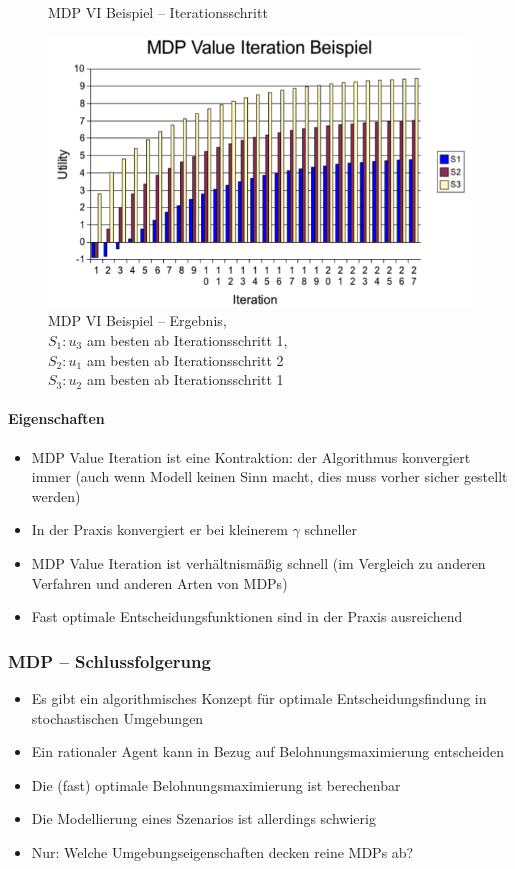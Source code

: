 \begin{itemize}
\begin{figure}[!h]
		\caption{MDP VI Beispiel -- Iterationsschritt}
		\label{fig:ch07:vi-bsp2}
	\end{figure}
	\begin{figure}[!h]
		\centering
  		\includegraphics[width=0.45\linewidth]{figures/ch07_vi-bsp3.png}
  		\centering
		\caption{MDP VI Beispiel -- Ergebnis, \\$S_1: u_3$ am besten ab Iterationsschritt 1,\\ $S_2: u_1$ am besten ab Iterationsschritt 2\\ $S_3: u_2$ am besten ab Iterationsschritt 1}
		\label{fig:ch07:vi-bsp2}
	\end{figure}
\end{itemize}
\paragraph{Eigenschaften}
\begin{itemize}
	\item MDP Value Iteration ist eine Kontraktion: der Algorithmus konvergiert immer (auch wenn Modell keinen Sinn macht, dies muss vorher sicher gestellt werden)
	\item In der Praxis konvergiert er bei kleinerem $\gamma$ schneller
	\item MDP Value Iteration ist verh\"altnism\"a{\ss}ig schnell (im Vergleich zu anderen Verfahren und anderen Arten von MDPs)
	\item Fast optimale Entscheidungsfunktionen sind in der Praxis ausreichend
\end{itemize}

\subsubsection{MDP -- Schlussfolgerung}
\begin{itemize}
	\item Es gibt ein algorithmisches Konzept für optimale Entscheidungsfindung in stochastischen Umgebungen
	\item Ein rationaler Agent kann in Bezug auf Belohnungsmaximierung entscheiden
	\item Die (fast) optimale Belohnungsmaximierung ist berechenbar
	\item Die Modellierung eines Szenarios ist allerdings schwierig 
	\item Nur: Welche Umgebungseigenschaften decken reine MDPs ab?
\end{itemize}

